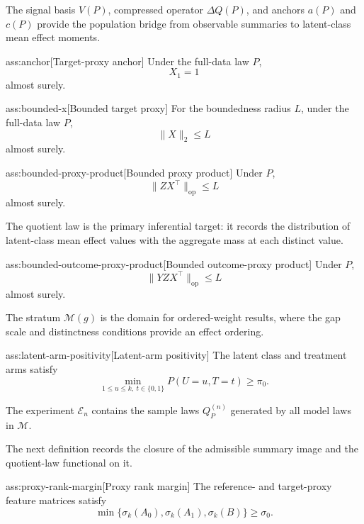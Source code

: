 The signal basis \(V(P)\), compressed operator \(\Delta Q(P)\), and anchors \(a(P)\) and \(c(P)\) provide the population bridge from observable summaries to latent-class mean effect moments.

\begin{assumptionv}{ass:anchor}[Target-proxy anchor]
Under the full-data law \(P\),
\[
X_1=1
\]
almost surely.
\end{assumptionv}

\begin{assumptionv}{ass:bounded-x}[Bounded target proxy]
For the boundedness radius \(L\), under the full-data law \(P\),
\[
\lVert X\rVert_2\le L
\]
almost surely.
\end{assumptionv}

\begin{assumptionv}{ass:bounded-proxy-product}[Bounded proxy product]
Under \(P\),
\[
\lVert ZX^\top\rVert_{\mathrm{op}}\le L
\]
almost surely.
\end{assumptionv}

The quotient law is the primary inferential target: it records the distribution of latent-class mean effect values with the aggregate mass at each distinct value.

\begin{assumptionv}{ass:bounded-outcome-proxy-product}[Bounded outcome-proxy product]
Under \(P\),
\[
\lVert YZX^\top\rVert_{\mathrm{op}}\le L
\]
almost surely.
\end{assumptionv}

The stratum \(\mathcal M(g)\) is the domain for ordered-weight results, where the gap scale and distinctness conditions provide an effect ordering.

\begin{assumptionv}{ass:latent-arm-positivity}[Latent-arm positivity]
The latent class and treatment arms satisfy
\[
\min_{1\le u\le k,\ t\in\{0,1\}} P(U=u,T=t)\ge \pi_0 .
\]
\end{assumptionv}

The experiment \(\mathcal E_n\) contains the sample laws \(Q_P^{(n)}\) generated by all model laws in \(\mathcal M\).

The next definition records the closure of the admissible summary image and the quotient-law functional on it.

\begin{assumptionv}{ass:proxy-rank-margin}[Proxy rank margin]
The reference- and target-proxy feature matrices satisfy
\[
\min\{\sigma_k(A_0),\sigma_k(A_1),\sigma_k(B)\}\ge \sigma_0 .
\]
\end{assumptionv}

